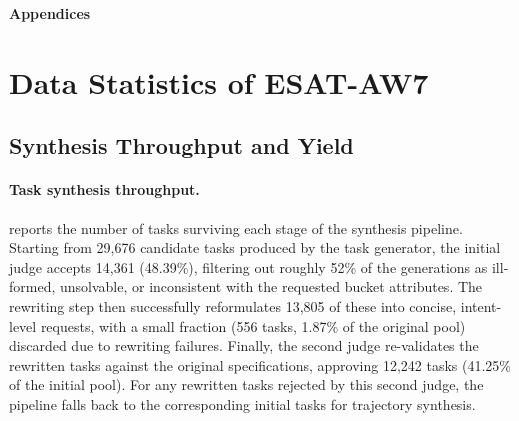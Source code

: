 \clearpage
\makeatletter
\let\ESATorigaddcl\addcontentsline
\def\ESATtoctype{toc}
\renewcommand\addcontentsline[3]{%
  \def\ESATtmp{#1}%
  \ifx\ESATtmp\ESATtoctype
    \ESATorigaddcl{apc}{#2}{#3}%
  \else
    \ESATorigaddcl{#1}{#2}{#3}%
  \fi}
{\bfseries\Huge Appendices\par}
\vspace{1.5em}
\makeatother
\vspace{1em}


% 
% 




% 

\section{Data Statistics of \textsc{ESAT}-AW7}
\label{app:stats-ESAT-AW7}

\subsection{Synthesis Throughput and Yield}
\label{app:appworld-throughput}

\paragraph{Task synthesis throughput.}
 reports the number of tasks surviving each stage of the synthesis pipeline. Starting from 29,676 candidate tasks produced by the task generator, the initial judge accepts 14,361 (48.39\%), filtering out roughly 52\% of the generations as ill-formed, unsolvable, or inconsistent with the requested bucket attributes. The rewriting step then successfully reformulates 13,805 of these into concise, intent-level requests, with a small fraction (556 tasks, 1.87\% of the original pool) discarded due to rewriting failures. Finally, the second judge re-validates the rewritten tasks against the original specifications, approving 12,242 tasks (41.25\% of the initial pool). For any rewritten tasks rejected by this second judge, the pipeline falls back to the corresponding initial tasks for trajectory synthesis.

